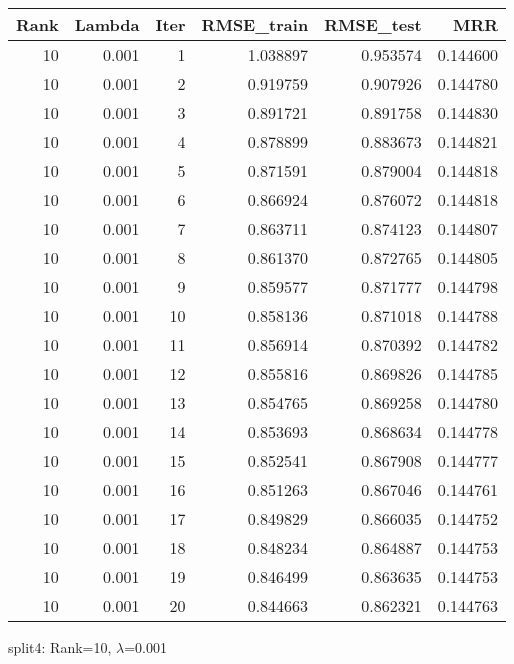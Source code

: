 \begin{tabular}{rrrrrr}
\toprule
 Rank &  Lambda &  Iter &  RMSE\_train &  RMSE\_test &       MRR \\
\midrule
   10 &   0.001 &     1 &    1.038897 &   0.953574 &  0.144600 \\
   10 &   0.001 &     2 &    0.919759 &   0.907926 &  0.144780 \\
   10 &   0.001 &     3 &    0.891721 &   0.891758 &  0.144830 \\
   10 &   0.001 &     4 &    0.878899 &   0.883673 &  0.144821 \\
   10 &   0.001 &     5 &    0.871591 &   0.879004 &  0.144818 \\
   10 &   0.001 &     6 &    0.866924 &   0.876072 &  0.144818 \\
   10 &   0.001 &     7 &    0.863711 &   0.874123 &  0.144807 \\
   10 &   0.001 &     8 &    0.861370 &   0.872765 &  0.144805 \\
   10 &   0.001 &     9 &    0.859577 &   0.871777 &  0.144798 \\
   10 &   0.001 &    10 &    0.858136 &   0.871018 &  0.144788 \\
   10 &   0.001 &    11 &    0.856914 &   0.870392 &  0.144782 \\
   10 &   0.001 &    12 &    0.855816 &   0.869826 &  0.144785 \\
   10 &   0.001 &    13 &    0.854765 &   0.869258 &  0.144780 \\
   10 &   0.001 &    14 &    0.853693 &   0.868634 &  0.144778 \\
   10 &   0.001 &    15 &    0.852541 &   0.867908 &  0.144777 \\
   10 &   0.001 &    16 &    0.851263 &   0.867046 &  0.144761 \\
   10 &   0.001 &    17 &    0.849829 &   0.866035 &  0.144752 \\
   10 &   0.001 &    18 &    0.848234 &   0.864887 &  0.144753 \\
   10 &   0.001 &    19 &    0.846499 &   0.863635 &  0.144753 \\
   10 &   0.001 &    20 &    0.844663 &   0.862321 &  0.144763 \\
\bottomrule
\end{tabular}

\caption{split4: Rank=10, $\lambda$=0.001}
